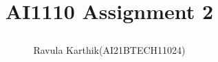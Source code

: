 \documentclass[journal,12pt,twocolumn]{IEEEtran}
\begin{document}
	\let\StandardTheFigure\thefigure
	\let\vec\mathbf
	
		
		
		
		\def\putbox#1#2#3{\makebox[0in][l]{\makebox[#1][l]{}\raisebox{\baselineskip}[0in][0in]{\raisebox{#2}[0in][0in]{#3}}}}
		\def\rightbox#1{\makebox[0in][r]{#1}}
		\def\centbox#1{\makebox[0in]{#1}}
		\def\topbox#1{\raisebox{-\baselineskip}[0in][0in]{#1}}
		\def\midbox#1{\raisebox{-0.5\baselineskip}[0in][0in]{#1}}
		
		
		\title{
			AI1110 Assignment 2 
			
		}
		\author{ 
			Ravula Karthik(AI21BTECH11024)
		}	
		
\end{document}
